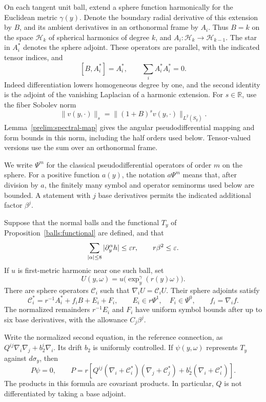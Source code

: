 On each tangent unit ball, extend a sphere function harmonically for the
Euclidean metric $\gamma(y)$.  Denote the boundary radial derivative of
this extension by $B$, and its ambient derivatives in an orthonormal frame
by $A_i$.  Thus $B=k$ on the space $\mathcal H_k$ of spherical harmonics
of degree $k$, and $A_i:\mathcal H_k\to\mathcal H_{k-1}$.  The star in
$A_i^*$ denotes the sphere adjoint.  These operators are parallel, with
the indicated tensor indices, and
\begin{equation}\label{angular:elementary-identities}
 [B,A_i^*]=A_i^*,\qquad \sum_i A_i^*A_i^*=0.
\end{equation}
Indeed differentiation lowers homogeneous degree by one, and the second
identity is the adjoint of the vanishing Laplacian of a harmonic extension.
For $s\in\mathbb R$, use the fiber Sobolev norm
\[
 \|v(y,\cdot)\|_s=\|(1+B)^s v(y,\cdot)\|_{L^2(S_y)}.
\]
Lemma~\ref{prelim:spectral-map} gives the angular pseudodifferential
mapping and form bounds in this norm, including the half orders used
below. Tensor-valued versions use the sum over an orthonormal frame.

We write $\Psi^m$ for the classical pseudodifferential operators of order
$m$ on the sphere.  For a positive function $a(y)$, the notation
$a\Psi^m$ means that, after division by $a$, the finitely many symbol and
operator seminorms used below are bounded.  A statement with $j$ base
derivatives permits the indicated additional factor $\beta^j$.

\begin{lemma}\label{angular:trace}
Suppose that the normal balls and the functional $T_y$ of
Proposition~\ref{balls:functional} are defined, and that
\begin{equation}\label{angular:smallness}
 \sum_{|\alpha|\le8}|\partial_y^\alpha h|\le\varepsilon r,
 \qquad r\beta^2\le\varepsilon.
\end{equation}
If $u$ is first-metric harmonic near one such ball, set
\[
 U(y,\omega)=u\bigl(\exp_y^\gamma(r(y)\omega)\bigr).
\]
There are sphere operators $\mathcal C_i$ such that
$\nabla_iU=\mathcal C_iU$.  Their sphere adjoints satisfy
\begin{equation}\label{angular:C-expansion}
 \mathcal C_i^*=r^{-1}A_i^*+f_iB+E_i+F_i,
 \qquad E_i\in r\Psi^1,\quad F_i\in\Psi^0,
 \qquad f_i=\nabla_i f.
\end{equation}
The normalized remainders $r^{-1}E_i$ and $F_i$ have uniform symbol
bounds after up to six base derivatives, with the allowance $C_j\beta^j$.

Write the normalized second equation, in the reference connection, as
$Q^{ij}\nabla_i\nabla_j+b_2^i\nabla_i$.  Its drift $b_2$ is uniformly
controlled.  If $\psi(y,\omega)$ represents $T_y$ against $d\sigma_y$,
then
\begin{equation}\label{angular:P-equation}
 P\psi=0,\qquad
 P=r\left[Q^{ij}(\nabla_i+\mathcal C_i^*)
                    (\nabla_j+\mathcal C_j^*)
             +b_2^i(\nabla_i+\mathcal C_i^*)\right].
\end{equation}
The products in this formula are covariant products.  In particular,
$Q$ is not differentiated by taking a base adjoint.
\end{lemma}

